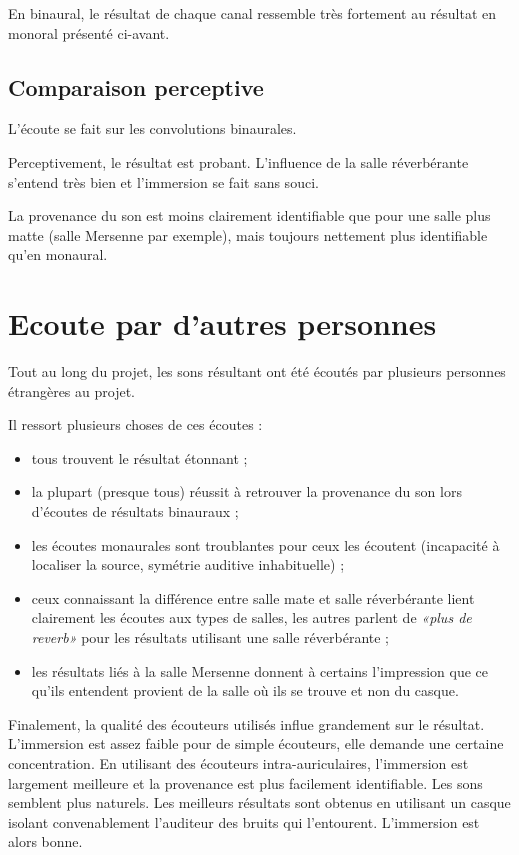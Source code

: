 En binaural, le résultat de chaque canal ressemble très fortement au résultat en monoral présenté ci-avant.

\subsection{Comparaison perceptive} %

L'écoute se fait sur les convolutions binaurales.

Perceptivement, le résultat est probant. L'influence de la salle réverbérante s'entend très bien et l'immersion se fait
sans souci.

La provenance du son est moins clairement identifiable que pour une salle plus matte (salle Mersenne par exemple),
mais toujours nettement plus identifiable qu'en monaural.

\section{Ecoute par d'autres personnes} %

Tout au long du projet, les sons résultant ont été écoutés par plusieurs personnes étrangères au projet.

Il ressort plusieurs choses de ces écoutes :

\begin{itemize}
    \item tous trouvent le résultat étonnant ;
    \item la plupart (presque tous) réussit à retrouver la provenance du son lors d'écoutes de résultats binauraux ;
    \item les écoutes monaurales sont troublantes pour ceux les écoutent (incapacité à localiser la source, symétrie 
    auditive inhabituelle) ;
    \item ceux connaissant la différence entre salle mate et salle réverbérante lient clairement les écoutes aux types
    de salles, les autres parlent de \textit{«plus de reverb»} pour les résultats utilisant une salle réverbérante ;
    \item les résultats liés à la salle Mersenne donnent à certains l'impression que ce qu'ils entendent provient de la
    salle où ils se trouve et non du casque.
\end{itemize}

Finalement, la qualité des écouteurs utilisés influe grandement sur le résultat. L'immersion est assez faible pour de
simple écouteurs, elle demande une certaine concentration. En utilisant des écouteurs intra-auriculaires, l'immersion
est largement meilleure et la provenance est plus facilement identifiable. Les sons semblent plus naturels. Les
meilleurs résultats sont obtenus en utilisant un casque isolant convenablement l'auditeur des bruits qui l'entourent.
L'immersion est alors bonne.
